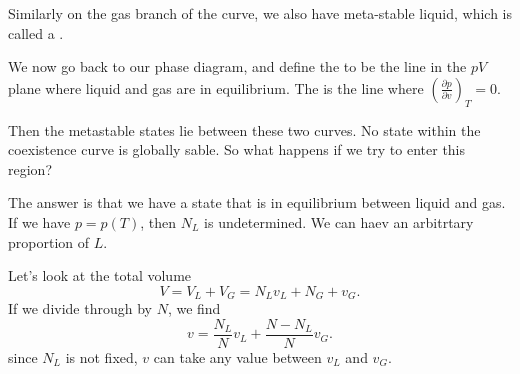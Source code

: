 \documentclass[a4paper]{article}
\begin{document}
Similarly on the gas branch of the curve, we also have meta-stable liquid, which is called a .

We now go back to our phase diagram, and define the  to be the line in the $pV$ plane where liquid and gas are in equilibrium. The  is the line where $\left(\frac{\partial p}{\partial v}\right)_T = 0$.
\begin{center}
\end{center}
Then the metastable states lie between these two curves. No state within the coexistence curve is globally sable. So what happens if we try to enter this region?

The answer is that we have a state that is in equilibrium between liquid and gas. If we have $p = p(T)$, then $N_L$ is undetermined. We can haev an arbitrtary proportion of $L$.

Let's look at the total volume
\[
  V = V_L + V_G = N_L v_L + N_G + v_G.
\]
If we divide through by $N$, we find
\[
  v = \frac{N_L}{N} v_L + \frac{N - N_L}{N} v_G.
\]
since $N_L$ is not fixed, $v$ can take any value between $v_L$ and $v_G$.
\end{document}

